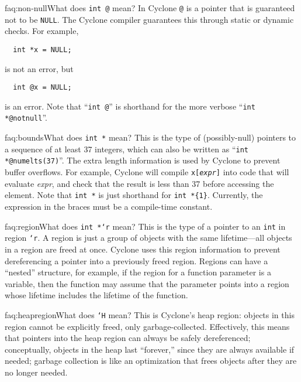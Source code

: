\begin{faqa}{faq:non-null}{What does \texttt{int @} mean?}
In Cyclone \texttt{@} is a pointer that is guaranteed not to be
\texttt{NULL}.  The Cyclone compiler guarantees this through static or
dynamic checks.  For example,
\begin{verbatim}
  int *x = NULL;
\end{verbatim}
is not an error, but
\begin{verbatim}
  int @x = NULL;
\end{verbatim}
is an error.  Note that ``\texttt{int @}'' is shorthand for the
more verbose ``\texttt{int *@notnull}''.  
\end{faqa}

\begin{faqa}{faq:bounds}{What does \texttt{int *\rb} mean?}
This is the type of (possibly-null) pointers to a sequence of at least 37 integers,
which can also be written as ``\texttt{int *@numelts(37)}''.
The extra length information is used by Cyclone to prevent buffer
overflows.  For example, Cyclone will compile
\texttt{x[\textup{\textit{expr}}]} into code that will evaluate
\textit{expr}, and check that the result is less than 37 before
accessing the element.  Note that \texttt{int *} is just shorthand for
\verb|int *{1}|.  Currently, the expression in the braces must be a
compile-time constant.
\end{faqa}

\begin{faqa}{faq:region}{What does \texttt{int *`r} mean?}
This is the type of a pointer to an \texttt{int} in region
\texttt{`r}.  A region is just a group of objects with the same
lifetime---all objects in a region are freed at once.  Cyclone uses
this region information to prevent dereferencing a pointer into a
previously freed region.  Regions can have a ``nested'' structure, for
example, if the region for a function parameter is a variable, then
the function may assume that the parameter points into a region whose
lifetime includes the lifetime of the function.
\end{faqa}

\begin{faqa}{faq:heapregion}{What does \texttt{`H} mean?}
  This is Cyclone's heap region: objects in this region cannot be
  explicitly freed, only garbage-collected.  Effectively, this means
  that pointers into the heap region can always be safely
  dereferenced; conceptually, objects in the heap last ``forever,''
  since they are always available if needed; garbage collection is
  like an optimization that frees objects after they are no longer
  needed.  
\end{faqa}

